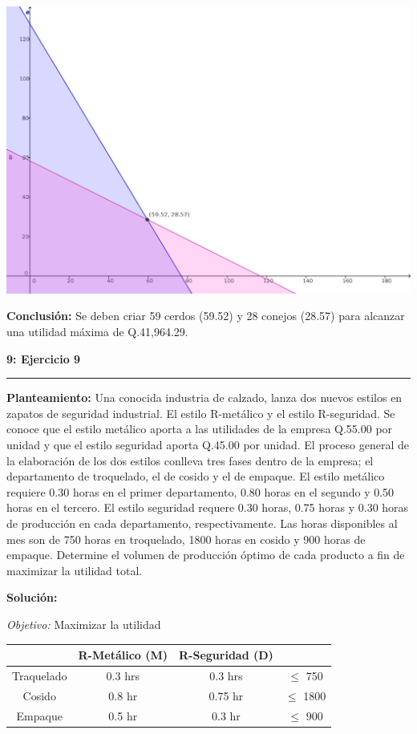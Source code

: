 \documentclass[11pt]{article}
\newcommand\problema[2]{\vspace{.01in}\textbf{#1: #2}\vspace{.5em}\hrule\vspace{.10in}}
\newcommand\planteamiento{\vspace{.10in}\textbf{Planteamiento: }}
\newcommand\solucion{\vspace{.10in}\textbf{Solución: }}
\newcommand\conclusion{\vspace{.10in}\textbf{Conclusión: }}
\newcommand\obj{\vspace{.10in}\textit{Objetivo: }}
\begin{document}
\begin{center}
\includegraphics[scale=0.4]{parcial1src/problema7.png}
\end{center}
\conclusion Se deben criar 59 cerdos (59.52) y 28 conejos (28.57) para alcanzar una utilidad máxima de Q.41,964.29.

\pagebreak
\problema{9}{Ejercicio 9}
\planteamiento
Una conocida industria de calzado, lanza dos nuevos estilos en zapatos de seguridad industrial. El estilo R-metálico y el estilo R-seguridad. Se conoce que el estilo metálico aporta a las utilidades de la empresa Q.55.00 por unidad y que el estilo seguridad aporta Q.45.00 por unidad. El proceso general de la elaboración de los dos estilos conlleva tres fases dentro de la empresa; el departamento de troquelado, el de cosido y el de empaque. El estilo metálico requiere 0.30 horas en el primer departamento, 0.80 horas en el segundo y 0.50 horas en el tercero. El estilo seguridad requere 0.30 horas, 0.75 horas y 0.30 horas de producción en cada departamento, respectivamente. Las horas disponibles al mes son de 750 horas en troquelado, 1800 horas en cosido y 900 horas de empaque. Determine el volumen de producción óptimo de cada producto a fin de maximizar la utilidad total.

\solucion

\obj Maximizar la utilidad

\begin{tabular}{|c|c|c|c|}
\hline 
 & R-Metálico (M) & R-Seguridad (D) &  \\ 
\hline 
Traquelado & 0.3 hrs & 0.3 hrs & $\leq$ 750 \\ 
\hline 
Cosido & 0.8 hr & 0.75 hr & $\leq$ 1800 \\ 
\hline 
Empaque & 0.5 hr & 0.3  hr & $\leq$ 900 \\ 
\hline 
\end{tabular}
\end{document}

